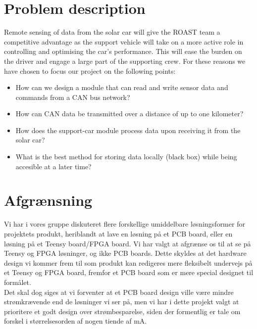 \documentclass[]{article}
\begin{document}
\section{Problem description}
Remote sensing of data from the solar car will give the ROAST team a competitive advantage as the support vehicle will take on a more active role in controlling and optimising the car's performance. This will ease the burden on the driver and engage a large part of the supporting crew. For these reasons we have chosen to focus our project on the following points:   
\begin{itemize}
    \item How can we design a module that can read and write sensor data and commands from a CAN bus network? 
    \item How can CAN data be transmitted over a distance of up to one kilometer? 
    \item How does the support-car module process data upon receiving it from the solar car?
    \item What is the best method for storing data locally (black box) while being accesible at a later time? 
\end{itemize}

\section{Afgrænsning}
Vi har i vores gruppe diskuteret flere forskellige umiddelbare løsningsformer for projektets produkt, heriblandt at lave en løsning på et PCB board, eller en løsning på et Teensy board/FPGA board. Vi har valgt at afgrænse os til at se på Teensy og FPGA løsninger, og ikke PCB boards. Dette skyldes at det hardware design vi kommer frem til som produkt kan redigeres mere fleksibelt undervejs på et Teensy og FPGA board, fremfor et PCB board som er mere special designet til formålet.\\
Det skal dog siges at vi forventer at et PCB board design ville være mindre strømkrævende end de løsninger vi ser på, men vi har i dette projekt valgt at prioritere et godt design over strømbesparelse, siden der formentlig er tale om forskel i størrelsesorden af nogen tiende af mA.
\end{document}
